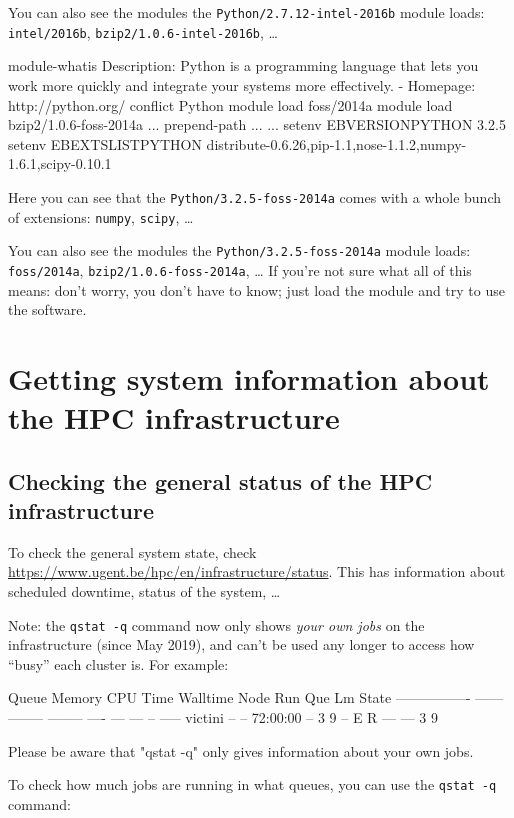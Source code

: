 You can also see the modules the \lstinline|Python/2.7.12-intel-2016b| module loads:
\lstinline|intel/2016b|, \lstinline|bzip2/1.0.6-intel-2016b|, \ldots

\else
\begin{prompt}
module-whatis	 Description: Python is a programming language that lets you work more quickly and integrate your systems more effectively. - Homepage: http://python.org/
conflict	 Python
module		 load foss/2014a
module		 load bzip2/1.0.6-foss-2014a
...
prepend-path ...
...
setenv		 EBVERSIONPYTHON 3.2.5
setenv		 EBEXTSLISTPYTHON distribute-0.6.26,pip-1.1,nose-1.1.2,numpy-1.6.1,scipy-0.10.1

\end{prompt}

Here you can see that the \lstinline|Python/3.2.5-foss-2014a| comes with a whole
bunch of extensions: \lstinline|numpy|, \lstinline|scipy|, \ldots

You can also see the modules the \lstinline|Python/3.2.5-foss-2014a| module loads:
\lstinline|foss/2014a|, \lstinline|bzip2/1.0.6-foss-2014a|, \ldots
\fi
If you're not sure what all of this means: don't worry, you don't have to know;
just load the module and try to use the software.

\section{Getting system information about the HPC infrastructure}

\subsection{Checking the general status of the HPC infrastructure}

\ifgent

To check the general system state, check \url{https://www.ugent.be/hpc/en/infrastructure/status}.
This has information about scheduled downtime, status of the system, \ldots

Note: the \lstinline|qstat -q| command now only shows \emph{your own jobs} on the
\hpcInfra infrastructure (since May 2019),
and can't be used any longer to access how ``busy'' each cluster is. For example:

\begin{prompt}
Queue            Memory CPU Time Walltime Node  Run Que Lm State
---------------- ------ -------- -------- ----  --- --- -- -----
victini            --      --    72:00:00  --    3   9  --  E R
                                                --- ---
                                                 3   9

Please be aware that "qstat -q" only gives information about your own jobs.
\end{prompt}
\else
To check how much jobs are running in what queues, you can use the \lstinline|qstat -q|
command:

